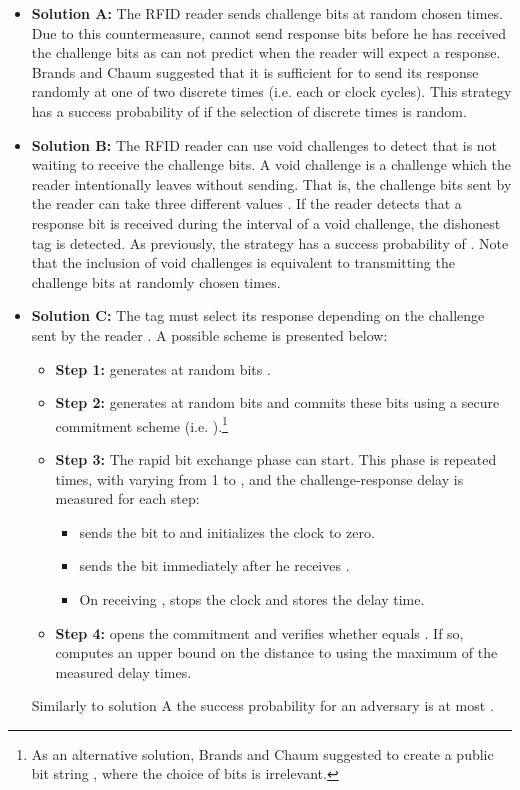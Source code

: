 \documentclass{article}
\begin{document}
\begin{itemize}
\item \textbf{Solution A:} The RFID reader sends challenge bits at random chosen times.  Due to this countermeasure,  cannot send response bits before he has received the challenge bits as  can not predict when the reader will expect a response. Brands and Chaum \cite{brands94} suggested that  it is sufficient for   to send its response randomly at one of two discrete times (i.e. each  or  clock cycles). This strategy has a success probability of  if the selection of discrete times is random.

\item \textbf{Solution B:} The RFID reader can use void challenges \cite{munilla2} to detect that  is not waiting to receive the challenge bits. A void challenge is a challenge which the reader intentionally leaves without sending. That is, the challenge bits   sent by the reader can take three different values . If the reader detects that a response bit is received during the interval of a void challenge, the dishonest tag  is detected.  As previously, the strategy has a success probability of . Note that the inclusion of void challenges is equivalent to transmitting the challenge bits  at randomly chosen times.
\item \textbf{Solution C:} The tag  must select its response depending on the challenge sent by the reader .  A possible scheme is presented below:
    \begin{itemize}
      \item \textbf{Step 1:}  generates at random  bits .
      \item \textbf{Step 2:}  generates at random  bits  and commits these bits using a secure commitment scheme (i.e. ).\footnote{As an alternative solution, Brands and Chaum \cite{brands94} suggested to create a public bit string , where the choice of bits  is irrelevant.}
       \item \textbf{Step 3:} The rapid bit exchange phase can start. This phase is repeated  times, with  varying from 1 to , and the challenge-response delay is measured for each step:
           \begin{itemize}
             \item  sends the bit  to  and initializes the clock to zero.
             \item  sends the bit  immediately after he receives .
             \item On receiving ,  stops the clock and stores the delay time.
           \end{itemize}
      \item \textbf{Step 4:}  opens the commitment and  verifies whether  equals . If so,  computes an upper bound on the distance to  using the maximum of the measured delay times.
    \end{itemize}

     Similarly to solution A the success probability for an adversary is at most  \cite{brands94}.
\end{itemize}
\end{document}
